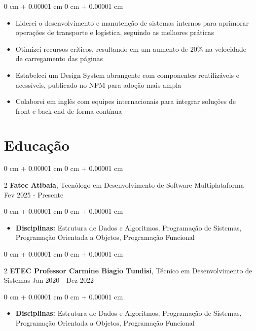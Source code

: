 \documentclass[10pt, letterpaper]{article}
\newenvironment{highlights}{ \begin{itemize}[ topsep=0.10 cm, parsep=0.10 cm, partopsep=0pt,
itemsep=0pt, leftmargin=0 cm + 10pt ] }{ \end{itemize} } %
\newenvironment{onecolentry}{ \begin{adjustwidth}{ 0 cm + 0.00001 cm }{ 0 cm + 0.00001 cm }
}{ \end{adjustwidth} } %
\newenvironment{twocolentry}[2][]{ \onecolentry \def\secondColumn{#2} \setcolumnwidth{\fill, 4.5 cm}
\begin{paracol}{2} }{ \switchcolumn \raggedleft \secondColumn \end{paracol}
\endonecolentry } %
\begin{document}
	\vspace{0.10 cm}
	\begin{onecolentry}
		\begin{highlights}
			\item Liderei o desenvolvimento e manutenção de sistemas internos para aprimorar operações de transporte e logística, seguindo as melhores práticas
			\item Otimizei recursos críticos, resultando em um aumento de 20\% na velocidade de carregamento das páginas
			\item Estabeleci um Design System abrangente com componentes reutilizáveis e acessíveis, publicado no NPM para adoção mais ampla
			\item Colaborei em inglês com equipes internacionais para integrar soluções de front e back-end de forma contínua
		\end{highlights}
	\end{onecolentry}

	\section{Educação}

	\begin{twocolentry}
		{ Fev 2025 - Presente } \textbf{Fatec Atibaia}, Tecnólogo em Desenvolvimento de Software Multiplataforma
	\end{twocolentry}

	\vspace{0.10 cm}
	\begin{onecolentry}
		\begin{highlights}
			\item \textbf{Disciplinas:} Estrutura de Dados e Algoritmos, Programação de Sistemas,
			Programação Orientada a Objetos, Programação Funcional
		\end{highlights}
	\end{onecolentry}

	\begin{twocolentry}
		{ Jan 2020 - Dez 2022 } \textbf{ETEC Professor Carmine Biagio Tundisi}, Técnico em
		Desenvolvimento de Sistemas
	\end{twocolentry}

	\vspace{0.10 cm}
	\begin{onecolentry}
		\begin{highlights}
			\item \textbf{Disciplinas:} Estrutura de Dados e Algoritmos, Programação de Sistemas,
			Programação Orientada a Objetos, Programação Funcional
		\end{highlights}
	\end{onecolentry}
\end{document}
